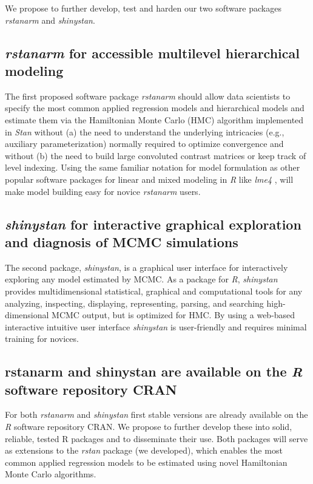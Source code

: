 \documentclass[11pt,notitlepage]{article}
\begin{document}
We propose to further develop, test and harden our two software packages \textit{rstanarm} and \textit{shinystan}.

\subsection*{\textit{rstanarm} for accessible multilevel hierarchical modeling}
The first proposed software package \textit{rstanarm} should allow data scientists to specify the most common applied regression models 
and hierarchical models and estimate them via the Hamiltonian Monte Carlo (HMC) algorithm implemented in \textit{Stan} without (a) 
the need to understand the underlying intricacies (e.g., auxiliary parameterization) normally required to optimize convergence and 
without (b) the need to build large convoluted contrast matrices  or keep track of level indexing. Using the same familiar notation for 
model formulation as other popular software packages for linear and mixed modeling in \textit{R} like \textit{lme4} \cite{lme4}, will 
make model building easy for novice \textit{rstanarm} users. 

\subsection*{\textit{shinystan} for interactive graphical exploration and diagnosis of MCMC simulations}  
The second package, \textit{shinystan}, is a graphical user interface for interactively exploring any model estimated by MCMC. As a 
package for \textit{R}, \textit{shinystan}  provides multidimensional statistical, graphical and computational tools for any analyzing,
inspecting, displaying, representing, parsing, and searching high-dimensional MCMC output, but is optimized for HMC. By using a web-based 
interactive intuitive user interface \textit{shinystan} is user-friendly and requires minimal training for novices.

\subsection*{rstanarm and shinystan are available on the \textit{R} software repository CRAN}
For both \textit{rstanarm} \cite{rstanarm} and \textit{shinystan} \cite{shinystan, Team2015} first stable versions are already 
available on the \textit{R} software  repository CRAN. We propose to further develop 
these into solid, reliable, tested R packages and to disseminate their use. Both packages will serve as extensions to the \textit{rstan} 
package (we developed), which enables the most common applied regression models to be estimated 
using novel Hamiltonian Monte Carlo algorithms. 
\end{document}
